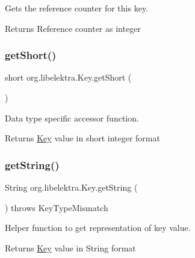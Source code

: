 Gets the reference counter for this key. 

\begin{DoxyReturn}{Returns}
Reference counter as integer 
\end{DoxyReturn}
\mbox{\label{classorg_1_1libelektra_1_1Key_a51754727fad0f4f9a540226ec329c74b}} 
\subsubsection{\texorpdfstring{getShort()}{getShort()}}
{\footnotesize\ttfamily short org.\+libelektra.\+Key.\+get\+Short (\begin{DoxyParamCaption}{ }\end{DoxyParamCaption})\hspace{0.3cm}{\ttfamily [inline]}}



Data type specific accessor function. 

\begin{DoxyReturn}{Returns}
\mbox{\hyperlink{classorg_1_1libelektra_1_1Key}{Key}} value in short integer format 
\end{DoxyReturn}
\mbox{\label{classorg_1_1libelektra_1_1Key_a3464485c19d49b6763f6c831cf5ed06c}} 
\subsubsection{\texorpdfstring{getString()}{getString()}}
{\footnotesize\ttfamily String org.\+libelektra.\+Key.\+get\+String (\begin{DoxyParamCaption}{ }\end{DoxyParamCaption}) throws Key\+Type\+Mismatch\hspace{0.3cm}{\ttfamily [inline]}}



Helper function to get representation of key value. 

\begin{DoxyReturn}{Returns}
\mbox{\hyperlink{classorg_1_1libelektra_1_1Key}{Key}} value in String format 
\end{DoxyReturn}

